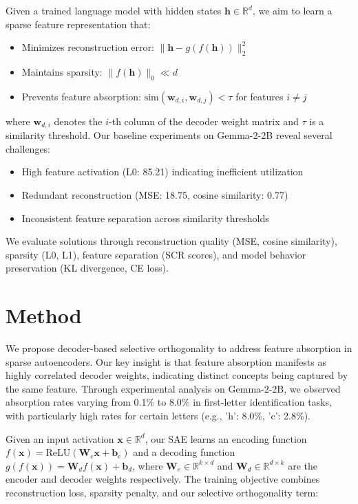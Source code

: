 \documentclass{article} %
\begin{document}
Given a trained language model with hidden states $\mathbf{h} \in \mathbb{R}^d$, we aim to learn a sparse feature representation that:

\begin{itemize}
\item Minimizes reconstruction error: $\|\mathbf{h} - g(f(\mathbf{h}))\|_2^2$
\item Maintains sparsity: $\|f(\mathbf{h})\|_0 \ll d$
\item Prevents feature absorption: $\text{sim}(\mathbf{w}_{d,i}, \mathbf{w}_{d,j}) < \tau$ for features $i \neq j$
\end{itemize}

where $\mathbf{w}_{d,i}$ denotes the $i$-th column of the decoder weight matrix and $\tau$ is a similarity threshold. Our baseline experiments on Gemma-2-2B reveal several challenges:

\begin{itemize}
\item High feature activation (L0: 85.21) indicating inefficient utilization
\item Redundant reconstruction (MSE: 18.75, cosine similarity: 0.77)
\item Inconsistent feature separation across similarity thresholds
\end{itemize}

We evaluate solutions through reconstruction quality (MSE, cosine similarity), sparsity (L0, L1), feature separation (SCR scores), and model behavior preservation (KL divergence, CE loss).

\section{Method}
\label{sec:method}

We propose decoder-based selective orthogonality to address feature absorption in sparse autoencoders. Our key insight is that feature absorption manifests as highly correlated decoder weights, indicating distinct concepts being captured by the same feature. Through experimental analysis on Gemma-2-2B, we observed absorption rates varying from 0.1\% to 8.0\% in first-letter identification tasks, with particularly high rates for certain letters (e.g., 'h': 8.0\%, 'c': 2.8\%).

Given an input activation $\mathbf{x} \in \mathbb{R}^d$, our SAE learns an encoding function $f(\mathbf{x}) = \text{ReLU}(\mathbf{W}_e\mathbf{x} + \mathbf{b}_e)$ and a decoding function $g(f(\mathbf{x})) = \mathbf{W}_df(\mathbf{x}) + \mathbf{b}_d$, where $\mathbf{W}_e \in \mathbb{R}^{k \times d}$ and $\mathbf{W}_d \in \mathbb{R}^{d \times k}$ are the encoder and decoder weights respectively. The training objective combines reconstruction loss, sparsity penalty, and our selective orthogonality term:
\end{document}
